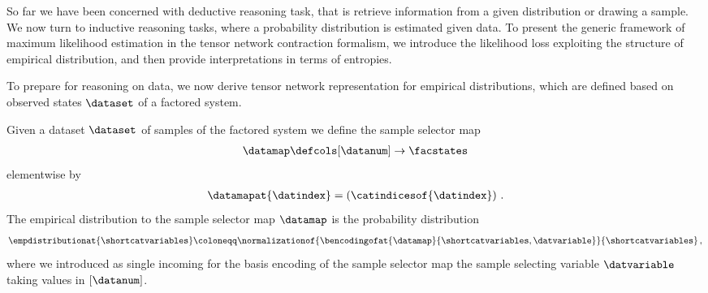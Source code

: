 
So far we have been concerned with deductive reasoning task, that is retrieve information from a given distribution or drawing a sample.
We now turn to inductive reasoning tasks, where a probability distribution is estimated given data.
To present the generic framework of maximum likelihood estimation in the tensor network contraction formalism, we introduce the likelihood loss exploiting the structure of empirical distribution, and then provide interpretations in terms of entropies.

\label{sec:empDistribution}

To prepare for reasoning on data, we now derive tensor network representation for empirical distributions, which are defined based on observed states $\dataset$ of a factored system.

\begin{definition}
    \label{def:dataMap}
    Given a dataset $\dataset$ of samples of the factored system we define the sample selector map
    \begin{align*}
        \datamap \defcols [\datanum] \rightarrow \facstates
    \end{align*}
    elementwise by
    \begin{align*}
        \datamapat{\datindex} = \left(\catindicesof{\datindex}\right) \, .
    \end{align*}
    The empirical distribution to the sample selector map $\datamap$ is the probability distribution
    \begin{align*}
        \empdistributionat{\shortcatvariables}
        \coloneqq \normalizationof{\bencodingofat{\datamap}{\shortcatvariables,\datvariable}}{\shortcatvariables} \, ,
    \end{align*}
    where we introduced as single incoming for the basis encoding of the sample selector map the sample selecting variable $\datvariable$ taking values in $[\datanum]$.
\end{definition}

